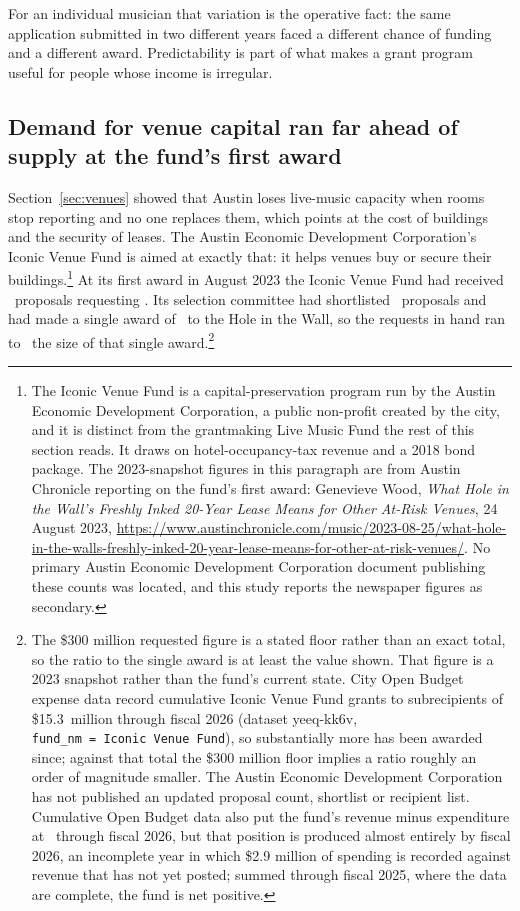 \vspace{3pt}
For an individual musician that variation is the operative fact: the same
application submitted in two different years faced a different chance of
funding and a different award. Predictability is part of what makes a
grant program useful for people whose income is irregular.

\subsection{Demand for venue capital ran far ahead of supply at the fund's first award}

Section~\ref{sec:venues} showed that Austin loses live-music capacity
when rooms stop reporting and no one replaces them, which points at the
cost of buildings and the security of leases. The Austin Economic
Development Corporation's Iconic Venue Fund is aimed at exactly that: it
helps venues buy or secure their buildings.\footnote{The Iconic Venue
Fund is a capital-preservation program run by the Austin Economic
Development Corporation, a public non-profit created by the city, and it
is distinct from the grantmaking Live Music Fund the rest of this
section reads. It draws on hotel-occupancy-tax revenue and a 2018 bond
package. The 2023-snapshot figures in this paragraph are from Austin
Chronicle reporting on the fund's first award: Genevieve Wood,
\textit{What Hole in the Wall's Freshly Inked 20-Year Lease Means for
Other At-Risk Venues}, 24 August 2023,
\url{https://www.austinchronicle.com/music/2023-08-25/what-hole-in-the-walls-freshly-inked-20-year-lease-means-for-other-at-risk-venues/}.
No primary Austin Economic Development Corporation document publishing
these counts was located, and this study reports the newspaper figures
as secondary.} At its first award in August 2023 the Iconic Venue Fund
had received \NCityIvfProposals\ proposals requesting
\NCityIvfRequested. Its selection committee had shortlisted
\NCityIvfShortlisted\ proposals and had made a single award of
\NCityIvfAwardTwoZeroTwoThree\ to the Hole in the Wall, so the requests
in hand ran to \NCityIvfRequestedToAwardRatio\ the size of that single
award.\footnote{The \$300 million requested figure is a stated floor
rather than an exact total, so the ratio to the single award is at least
the value shown. That figure is a 2023 snapshot rather than the fund's
current state. City Open Budget expense data record cumulative Iconic
Venue Fund grants to subrecipients of \$15.3~million through fiscal 2026
(dataset yeeq-kk6v, \texttt{fund\_nm~=~Iconic~Venue~Fund}), so
substantially more has been awarded since; against that total the \$300
million floor implies a ratio roughly an order of magnitude smaller. The
Austin Economic Development Corporation has not published an updated
proposal count, shortlist or recipient list. Cumulative Open Budget data
also put the fund's revenue minus expenditure at
\NCityIvfCumulativeNetNominalFyTwoSix\ through fiscal 2026, but that
position is produced almost entirely by fiscal 2026, an incomplete year
in which \$2.9 million of spending is recorded against revenue that has
not yet posted; summed through fiscal 2025, where the data are complete,
the fund is net positive.}

